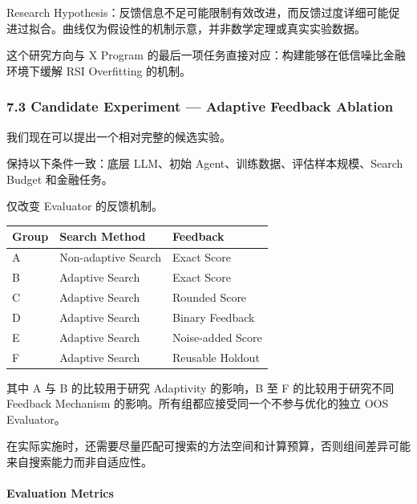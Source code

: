 Research Hypothesis：反馈信息不足可能限制有效改进，而反馈过度详细可能促进过拟合。曲线仅为假设性的机制示意，并非数学定理或真实实验数据。

这个研究方向与 X Program 的最后一项任务直接对应：构建能够在低信噪比金融环境下缓解 RSI Overfitting 的机制。

\hypertarget{part-2-20-0001-candidate-experiment-adaptive-feedback-ablation}{%
\subsubsection{7.3 Candidate Experiment --- Adaptive Feedback Ablation}\label{part-2-20-0001-candidate-experiment-adaptive-feedback-ablation}}

我们现在可以提出一个相对完整的候选实验。

保持以下条件一致：底层 LLM、初始 Agent、训练数据、评估样本规模、Search Budget 和金融任务。

仅改变 Evaluator 的反馈机制。

\begin{readertable}
\begin{longtable}[]{@{}
  >{\raggedright\arraybackslash}p{}
  >{\raggedright\arraybackslash}p{}
  >{\raggedright\arraybackslash}p{}@{}}
\toprule
Group & Search Method & Feedback \\
\midrule
\endhead
A & Non-adaptive Search & Exact Score \\
B & Adaptive Search & Exact Score \\
C & Adaptive Search & Rounded Score \\
D & Adaptive Search & Binary Feedback \\
E & Adaptive Search & Noise-added Score \\
F & Adaptive Search & Reusable Holdout \\
\bottomrule
\end{longtable}
\end{readertable}

其中 A 与 B 的比较用于研究 Adaptivity 的影响，B 至 F 的比较用于研究不同 Feedback Mechanism 的影响。所有组都应接受同一个不参与优化的独立 OOS Evaluator。

在实际实施时，还需要尽量匹配可搜索的方法空间和计算预算，否则组间差异可能来自搜索能力而非自适应性。

\hypertarget{part-2-20-0001-evaluation-metrics}{%
\paragraph{Evaluation Metrics}\label{part-2-20-0001-evaluation-metrics}}

